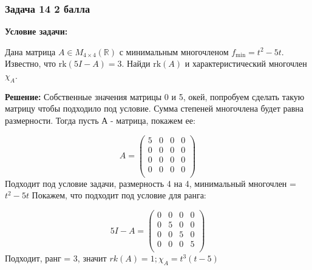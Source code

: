 \documentclass[a4paper,12pt]{article}
\begin{document}
\subsubsection{Задача 14 \hfill 2 балла}
\textbf{Условие задачи:}

Дана матрица \( A \in M_{4 \times 4}(\mathbb{R}) \) с минимальным многочленом \( f_{\text{min}} = t^2 - 5t \). Известно, что \( \text{rk}(5I - A) = 3 \). Найди \( \text{rk}(A) \) и характеристический многочлен \( \chi_A \).

\textbf{Решение:}
Собственные значения матрицы 0 и 5, окей, попробуем сделать такую матрицу чтобы подходило под условие. Сумма степеней многочлена будет равна размерности. Тогда пусть А - матрица, покажем ее:

\[
A = 
\begin{pmatrix}
    5& 0 &0& 0\\
    0 &0 &0 &0\\
    0 &0 &0 &0\\
    0 &0& 0 &0\\
\end{pmatrix}
\]
Подходит под условие задачи, размерность 4 на 4, минимальный многочлен = $t^2-5t$ Покажем, что подходит под условие для ранга: 

\[
5I-A = 
\begin{pmatrix}
    0& 0 &0& 0\\
    0 &5 &0 &0\\
    0 &0 &5 &0\\
    0 &0& 0 &5\\
\end{pmatrix}
\]
Подходит, ранг = 3, значит $rk(A) = 1 ;\chi_A = t^3(t-5)$ 
\end{document}
